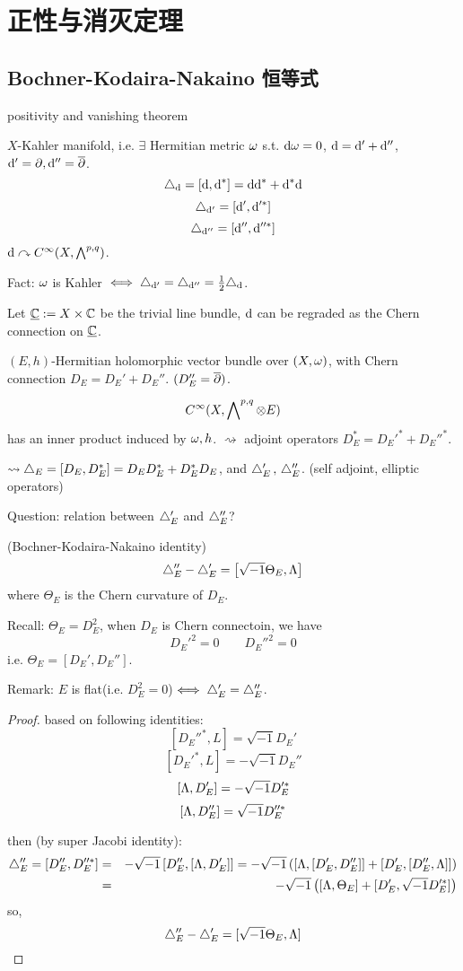 \chapter{正性与消灭定理}

\section{Bochner-Kodaira-Nakaino 恒等式}
positivity and vanishing theorem

$X$-Kahler manifold, i.e. $\exists$ Hermitian metric $\omega$ s.t. $\mathrm{d}\omega=0$,
$\mathrm{d}=\mathrm{d}'+\mathrm{d}''$, $\mathrm{d}'=\partial,\mathrm{d}''=\overline{\partial}$.
$$\triangle_{\mathrm{d}}=[\mathrm{d},\mathrm{d}^*]=\mathrm{d}\mathrm{d}^*+\mathrm{d}^*\mathrm{d}$$
$$\triangle_{\mathrm{d}'}=[\mathrm{d}',\mathrm{d}'^*]$$
$$\triangle_{\mathrm{d}''}=[\mathrm{d}'',\mathrm{d}''^*]$$
$\mathrm{d}\curvearrowright C^{\infty}(X,\bigwedge\nolimits^{p,q})$.

Fact: $\omega$ is Kahler $\iff\triangle_{\mathrm{d}'}=\triangle_{\mathrm{d}''}=\frac{1}{2}\triangle_{\mathrm{d}}$.

Let $\underline{\mathbb{C}}:=X\times\mathbb{C}$ be the trivial line bundle,
$\mathrm{d}$ can be regraded as the Chern connection on $\underline{\mathbb{C}}$.

$(E,h)$-Hermitian holomorphic vector bundle over $(X,\omega)$,
with Chern connection $D_E=D_E'+D_E''$. $(D_E''=\overline{\partial})$.

$$C^\infty(X,\bigwedge\nolimits^{p,q}\otimes E)$$
has an inner product induced by $\omega,h$.
$\rightsquigarrow$ adjoint operators $D_E^*=D_E'^*+D_E''^*$.

$\rightsquigarrow\triangle_E=[D_E,D_E^*]=D_ED_E^*+D_E^*D_E$, and
$\triangle_E'\,,\,\triangle_E''$. (self adjoint, elliptic operators)

Question: relation between $\triangle_E'$ and $\triangle_E''$?

\begin{thm}(Bochner-Kodaira-Nakaino identity)
$$
  \triangle_E''-\triangle_E'
=
  \left[
    \sqrt{-1}
    \Theta_E
  ,
    \Lambda
  \right]
$$
where $\Theta_E$ is the Chern curvature of $D_E$.
\end{thm}

Recall: $\Theta_E=D_E^2$, when $D_E$ is Chern connectoin, we have
$$D_E'^2=0\qquad D_E''^2=0$$
i.e. $\Theta_E=[D_E',D_E'']$.

Remark: $E$ is flat(i.e. $D_E^2=0$)$\iff \triangle_E'=\triangle_E''$.

\begin{proof}
based on following identities:
$$[D_E''^*,L]=\sqrt{-1}D_E'$$
$$[D_E'^*,L]=-\sqrt{-1}D_E''$$
$$[\Lambda,D_E']=-\sqrt{-1}D_E'^*$$
$$[\Lambda,D_E'']=\sqrt{-1}D_E''^*$$

then (by super Jacobi identity):
\begin{eqnarray*}
  \triangle_E''=[D_E'',D_E''^*]
&=&
  -\sqrt{-1}
  \left[
    D_E''
  ,
    [\Lambda,D_E']
  \right]
=
  -\sqrt{-1}
  \left(
    [\Lambda,[D_E',D_E'']]
   +[D_E',[D_E'',\Lambda]]
  \right)\\
&=&
  -\sqrt{-1}
  \left(
    [\Lambda,\Theta_E]
   +[D_E',\sqrt{-1}D_E'^*]
  \right)
\end{eqnarray*}
so,
$$\triangle_E''-\triangle_E'=[\sqrt{-1}\Theta_E,\Lambda]$$
\end{proof}

